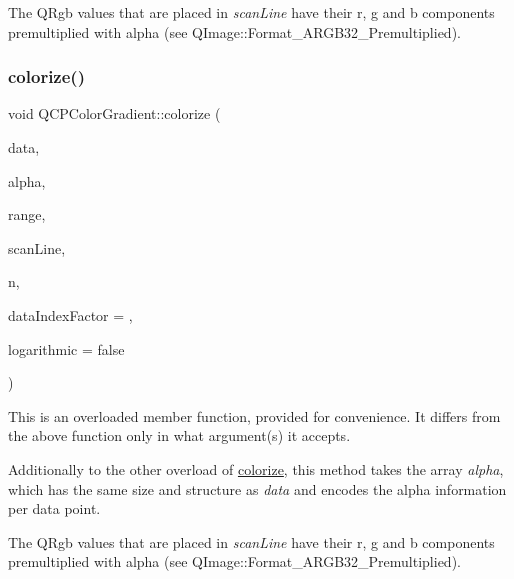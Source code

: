 The Q\+Rgb values that are placed in {\itshape scan\+Line} have their r, g and b components premultiplied with alpha (see Q\+Image\+::\+Format\+\_\+\+A\+R\+G\+B32\+\_\+\+Premultiplied). \mbox{\label{class_q_c_p_color_gradient_acf0cc7fba83ef21f7b8d5d5258519db3}} 
\subsubsection{\texorpdfstring{colorize()}{colorize()}\hspace{0.1cm}{\footnotesize\ttfamily [2/2]}}
{\footnotesize\ttfamily void Q\+C\+P\+Color\+Gradient\+::colorize (\begin{DoxyParamCaption}\item[{const double $\ast$}]{data,  }\item[{const unsigned char $\ast$}]{alpha,  }\item[{const \hyperlink{class_q_c_p_range}{Q\+C\+P\+Range} \&}]{range,  }\item[{Q\+Rgb $\ast$}]{scan\+Line,  }\item[{int}]{n,  }\item[{int}]{data\+Index\+Factor = {},  }\item[{bool}]{logarithmic = {\ttfamily false} }\end{DoxyParamCaption})}

This is an overloaded member function, provided for convenience. It differs from the above function only in what argument(s) it accepts.

Additionally to the other overload of \hyperlink{class_q_c_p_color_gradient_aaf423ceb943e177b0ed2c48c811d83dc}{colorize}, this method takes the array {\itshape alpha}, which has the same size and structure as {\itshape data} and encodes the alpha information per data point.

The Q\+Rgb values that are placed in {\itshape scan\+Line} have their r, g and b components premultiplied with alpha (see Q\+Image\+::\+Format\+\_\+\+A\+R\+G\+B32\+\_\+\+Premultiplied). \mbox{\label{class_q_c_p_color_gradient_aaab19729e921682401044ac8e518ff02}} 
